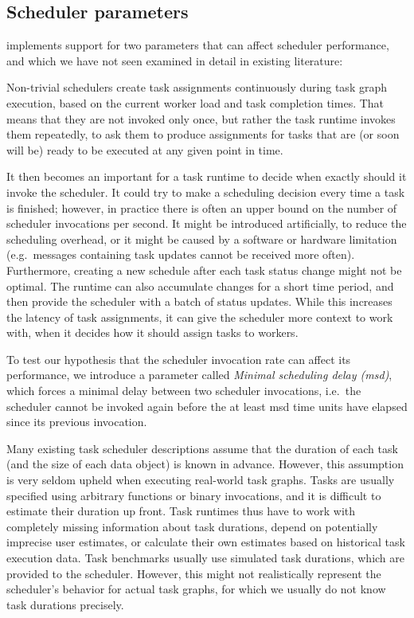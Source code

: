 \subsection{Scheduler parameters}
\estee{} implements support for two parameters that can affect scheduler
performance, and which we have not seen examined in detail in existing literature:
\begin{description}[wide=0pt]
	\item[Minimal scheduling delay] Non-trivial schedulers create task assignments continuously during task graph execution, based on
		the current worker load and task completion times. That means that they are not invoked only once,
		but rather the task runtime invokes them repeatedly, to ask them to produce assignments for tasks
		that are (or soon will be) ready to be executed at any given point in time.

		It then becomes an important for a task runtime to decide when exactly should it invoke the
		scheduler. It could try to make a scheduling decision every time a task is finished; however, in
		practice there is often an upper bound on the number of scheduler invocations per second. It might
		be introduced artificially, to reduce the scheduling overhead, or it might be caused by a software
		or hardware limitation (e.g.\ messages containing task updates cannot be received more often).
		Furthermore, creating a new schedule after each task status change might not be optimal. The
		runtime can also accumulate changes for a short time period, and then provide the scheduler with a
		batch of status updates. While this increases the latency of task assignments, it can give the
		scheduler more context to work with, when it decides how it should assign tasks to workers.

		To test our hypothesis that the scheduler invocation rate can affect its performance, we introduce
		a parameter called \emph{Minimal scheduling delay (\acrshort{msd})}, which forces a minimal delay between two scheduler
		invocations, i.e.\ the scheduler cannot be invoked again before the at least
		\gls{msd} time units have elapsed since its previous invocation.
	\item[Information mode] Many existing task scheduler descriptions assume that the duration of each task (and the size of
		each data object) is known in advance. However, this assumption is very seldom upheld when
		executing real-world task graphs. Tasks are usually specified using arbitrary functions or binary
		invocations, and it is difficult to estimate their duration up front. Task runtimes thus have to
		work with completely missing information about task durations, depend on potentially imprecise user
		estimates, or calculate their own estimates based on historical task execution data. Task
		benchmarks usually use simulated task durations, which are provided to the scheduler. However, this
		might not realistically represent the scheduler's behavior for actual task graphs, for which we
		usually do not know task durations precisely.


\end{description}
